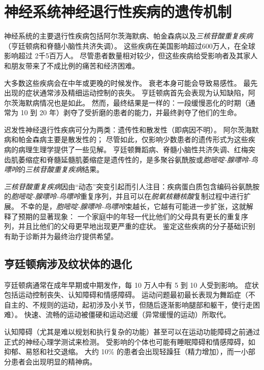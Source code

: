 \chapter{神经系统神经退行性疾病的遗传机制} \label{chap:chap63}

神经系统的主要退行性疾病包括阿尔茨海默病、帕金森病以及\textit{三核苷酸重复疾病}（亨廷顿病和脊髓小脑性共济失调）。
这些疾病在美国影响超过600万人，在全球影响超过 2千5百万人。
尽管患者数量相对较少，但这些疾病给受影响者及其家人和朋友带来了不成比例的痛苦和经济困难。


大多数这些疾病会在中年或更晚的时候发作。
衰老本身可能会导致易感性。
最先出现的症状通常涉及精细运动控制的丧失。
亨廷顿病首先会表现为认知缺陷，阿尔茨海默病情况也是如此。
然而，最终结果是一样的：一段缓慢恶化的时期（通常为 10 到 20 年）剥夺了受折磨的患者的能力，并最终剥夺了他们的生命。


迟发性神经退行性疾病可分为两类：遗传性和散发性（即病因不明）。
阿尔茨海默病和帕金森病主要是散发性的；
尽管如此，仅影响少数患者的遗传形式为这些疾病的病理生理学提供了一些见解。
亨廷顿舞蹈病、脊髓小脑性共济失调、红梅突齿肌萎缩症和脊髓延髓肌萎缩症是遗传性的，是多聚谷氨酰胺或\textit{胞嘧啶-腺嘌呤-鸟嘌呤}的\textit{三核苷酸重复疾病}结果。


\textit{三核苷酸重复疾病}因由“动态”突变引起而引人注目：疾病蛋白质包含编码谷氨酰胺的\textit{胞嘧啶-腺嘌呤-鸟嘌呤}重复序列，并且可以在\textit{脱氧核糖核酸}复制过程中进行扩展。
不幸的是，\textit{胞嘧啶-腺嘌呤-鸟嘌呤}束越长，它越有可能进一步扩张，这就解释了预期的显著现象：
一个家庭中的年轻一代比他们的父母具有更长的重复序列，并且比他们的父母更早地出现更严重的症状。
鉴定这些疾病的分子基础识别有助于诊断并为最终治疗提供希望。



\section{亨廷顿病涉及纹状体的退化}

亨廷顿病通常在成年早期或中期发作，每 10 万人中有 5 到 10 人受到影响。
症状包括运动控制丧失、认知障碍和情感障碍。
运动问题最初最长表现为舞蹈症（不自主的、不规则的运动，起初涉及小关节，但随后逐渐影响腿部和躯干，使行走困难）。
快速、流畅的运动被僵硬和运动迟缓（异常缓慢的运动）所取代。


认知障碍（尤其是难以规划和执行复杂的功能）甚至可以在运动功能障碍之前通过正式的神经心理学测试来检测。
受影响的个体也可能有睡眠障碍和情感障碍，如抑郁、易怒和社交退缩。
大约 10\% 的患者会出现轻躁狂（精力增加），而一小部分患者会出现明显的精神病。



